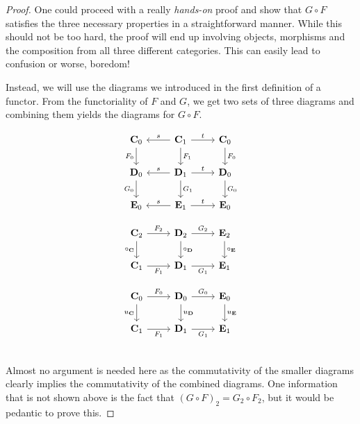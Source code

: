 \documentclass{article}
\theoremstyle{definition}
\theoremstyle{remark}
\begin{document}
\begin{proof}
	One could proceed with a really \textit{hands-on} proof and show that $G \circ F$ satisfies the three necessary properties in a straightforward manner. While this should not be too hard, the proof will end up involving objects, morphisms and the composition from all three different categories. This can easily lead to confusion or worse, boredom!
	
	Instead, we will use the diagrams we introduced in the first definition of a functor. From the functoriality of $F$ and $G$, we get two sets of three diagrams and combining them yields the diagrams for $G \circ F$.
	
	\begin{equation}\label{diag-comp1}
		\begin{tikzcd}
			\mathbf{C}_0 \arrow[d, "F_0"'] & \mathbf{C}_1 \arrow[d, "F_1"] \arrow[r, "t"] \arrow[l, "s"'] & \mathbf{C}_0 \arrow[d, "F_0"] \\
			\mathbf{D}_0 \arrow[d, "G_0"'] & \mathbf{D}_1 \arrow[d, "G_1"] \arrow[r, "t"] \arrow[l, "s"'] & \mathbf{D}_0 \arrow[d, "G_0"] \\
			\mathbf{E}_0                   & \mathbf{E}_1 \arrow[r, "t"] \arrow[l, "s"']                  & \mathbf{E}_0                 
		\end{tikzcd}
	\end{equation}
	\begin{minipage}{0.48\textwidth}
		\begin{equation}\label{diag-comp2}
			\begin{tikzcd}
				\mathbf{C}_2 \arrow[r, "F_2"] \arrow[d, "\circ_{\mathbf{C}}"'] & \mathbf{D}_2 \arrow[r, "G_2"] \arrow[d, "\circ_{\mathbf{D}}"] & \mathbf{E}_2 \arrow[d, "\circ_{\mathbf{E}}"] \\
				\mathbf{C}_1 \arrow[r, "F_1"']                      & \mathbf{D}_1 \arrow[r, "G_1"']                     & \mathbf{E}_1                     
			\end{tikzcd}
		\end{equation}
	\end{minipage}
	\begin{minipage}{0.48\textwidth}
			\begin{equation}\label{diag-comp3}
				\begin{tikzcd}
					\mathbf{C}_0 \arrow[r, "F_0"] \arrow[d, "u_{\mathbf{C}}"'] & \mathbf{D}_0 \arrow[r, "G_0"] \arrow[d, "u_{\mathbf{D}}"] & \mathbf{E}_0 \arrow[d, "u_{\mathbf{E}}"] \\
					\mathbf{C}_1 \arrow[r, "F_1"']                  & \mathbf{D}_1 \arrow[r, "G_1"']                 & \mathbf{E}_1                 
				\end{tikzcd}
		\end{equation}
	\end{minipage}\\
	Almost no argument is needed here as the commutativity of the smaller diagrams clearly implies the commutativity of the combined diagrams. One information that is not shown above is the fact that $(G\circ F)_2 = G_2 \circ F_2$, but it would be pedantic to prove this.
\end{proof}
\end{document}
